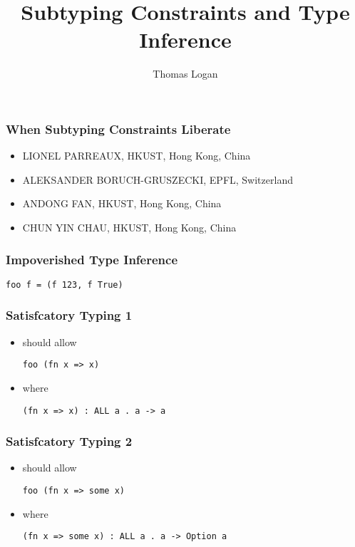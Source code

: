 \documentclass{beamer}
\title{Subtyping Constraints and Type Inference}
\author{Thomas Logan}
\begin{document}
\begin{frame}
  \titlepage
\end{frame}

\begin{frame}
  \frametitle{When Subtyping Constraints Liberate}

  \begin{itemize}
  \item LIONEL PARREAUX, HKUST, Hong Kong, China
  \item ALEKSANDER BORUCH-GRUSZECKI, EPFL, Switzerland
  \item ANDONG FAN, HKUST, Hong Kong, China
  \item CHUN YIN CHAU, HKUST, Hong Kong, China
  \end{itemize}
\end{frame}

\begin{frame}[fragile]
  \frametitle{Impoverished Type Inference}

  \begin{lstlisting}
foo f = (f 123, f True)
  \end{lstlisting}

\end{frame}


\begin{frame}[fragile]
  \frametitle{Satisfcatory Typing 1}

  \begin{itemize}
  \item should allow
  \begin{lstlisting}
foo (fn x => x)
  \end{lstlisting}
  \item where
  \begin{lstlisting}
(fn x => x) : ALL a . a -> a
  \end{lstlisting}
  \end{itemize}

\end{frame}


\begin{frame}[fragile]
  \frametitle{Satisfcatory Typing 2}

  \begin{itemize}
  \item should allow
  \begin{lstlisting}
foo (fn x => some x)
  \end{lstlisting}
  \item where
  \begin{lstlisting}
(fn x => some x) : ALL a . a -> Option a
  \end{lstlisting}
  \end{itemize}

\end{frame}
\end{document}
